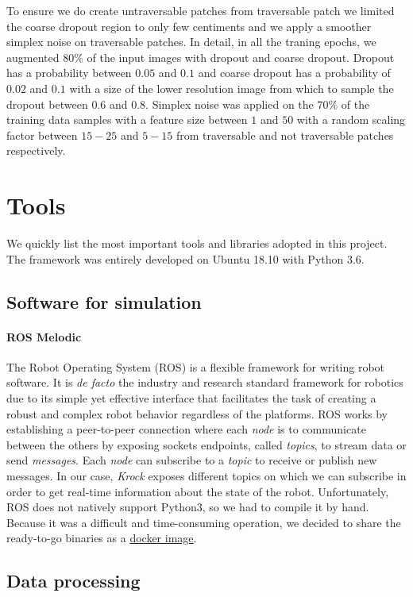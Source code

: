 \documentclass[../document.tex]{subfiles}
\begin{document}
To ensure we do create untraversable patches from traversable patch we limited the coarse dropout region to only few centiments and we apply a smoother simplex noise on traversable patches. In detail, in all the traning epochs, we augmented $80\%$ of the input images with dropout and coarse dropout. Dropout has a probability between $0.05$ and $0.1$ and coarse dropout has a probability of $0.02$ and $0.1$ with a size of the lower resolution image from which to sample the dropout between $0.6$ and $0.8$. Simplex noise was applied on the $70\%$ of the training data samples with a feature size between $1$ and $50$ with a random scaling factor between $15 - 25$ and $5 - 15$ from traversable and not traversable patches respectively. 

\section{Tools}
We quickly list the most important tools and libraries adopted in this project. The framework was entirely developed on Ubuntu 18.10 with Python 3.6.
\subsection{Software for simulation}
\paragraph{ROS Melodic} The Robot Operating System (ROS) \cite{ROS} is a flexible framework for writing robot software. It is \emph{de facto} the industry and research standard framework for robotics due to its simple yet effective interface that facilitates the task of creating a robust and complex robot behavior regardless of the platforms. ROS works by establishing a peer-to-peer connection where each \emph{node} is to communicate between the others by exposing sockets endpoints, called \emph{topics}, to stream data or send \emph{messages}. Each \emph{node} can subscribe to a \emph{topic} to receive or publish new messages. In our case, \emph{Krock} exposes different topics on which we can subscribe in order to get real-time information about the state of the robot.
Unfortunately, ROS does not natively support Python3, so we had to compile it by hand. Because it was a difficult and time-consuming operation, we decided to share the ready-to-go binaries as a \href{https://hub.docker.com/r/zuppif/ros-melodic-python3/}{docker image}. 

\subsection{Data processing}
\end{document}

